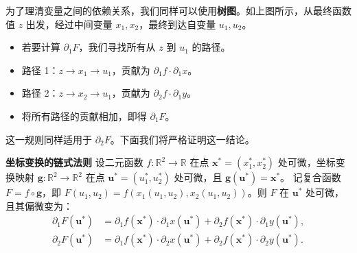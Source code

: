\documentclass[12pt,UTF8]{ctexbook}
\begin{document}
为了理清变量之间的依赖关系，我们同样可以使用\textbf{树图}。如上图所示，从最终函数值 $z$ 出发，经过中间变量 $x_1, x_2$，最终到达自变量 $u_1, u_2$。
\begin{itemize}
\item 若要计算 $\partial_1 F$，我们寻找所有从 $z$ 到 $u_1$ 的路径。
\item 路径 1：$z \to x_1 \to u_1$，贡献为 $\partial_1 f \cdot \partial_1 x$。
\item 路径 2：$z \to x_2 \to u_1$，贡献为 $\partial_2 f \cdot \partial_1 y$。
\item 将所有路径的贡献相加，即得 $\partial_1 F$。
\end{itemize}
这一规则同样适用于 $\partial_2 F$。下面我们将严格证明这一结论。

\begin{tm}{\textbf{坐标变换的链式法则}}
设二元函数 $f: \mathbb{R}^2 \to \mathbb{R}$ 在点 $\mathbf{x}^* = (x_1^*, x_2^*)$ 处可微，坐标变换映射 $\mathbf{g}: \mathbb{R}^2 \to \mathbb{R}^2$ 在点 $\mathbf{u}^* = (u_1^*, u_2^*)$ 处可微，且 $\mathbf{g}(\mathbf{u}^*) = \mathbf{x}^*$。
记复合函数 $F = f \circ \mathbf{g}$，即 $F(u_1, u_2) = f(x_1(u_1, u_2), x_2(u_1, u_2))$。则 $F$ 在 $\mathbf{u}^*$ 处可微，且其偏微变为：
\begin{align*}
\partial_1 F(\mathbf{u}^*) &= \partial_1 f(\mathbf{x}^*) \cdot \partial_1 x(\mathbf{u}^*) + \partial_2 f(\mathbf{x}^*) \cdot \partial_1 y(\mathbf{u}^*), \\
\partial_2 F(\mathbf{u}^*) &= \partial_1 f(\mathbf{x}^*) \cdot \partial_2 x(\mathbf{u}^*) + \partial_2 f(\mathbf{x}^*) \cdot \partial_2 y(\mathbf{u}^*).
\end{align*}
\end{tm}
\end{document}
